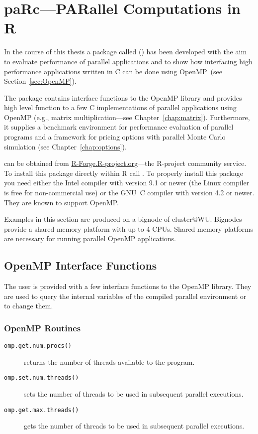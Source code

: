 \section{paRc---PARallel Computations in R}
\label{sec:paRc}

In the course of this thesis a package called 
(\cite{theussl07paRc}) has been developed with the aim
to evaluate performance of parallel applications and to show how
interfacing high performance applications written in C can be done
using OpenMP~(see Section~\ref{sec:OpenMP}).

The package  contains interface functions to the OpenMP library
and provides high level function to a few C implementations of
parallel applications using OpenMP (e.g., matrix multiplication---see
Chapter~\ref{chap:matrix}).
Furthermore, it supplies a benchmark environment for performance
evaluation of parallel programs and a framework for pricing options
with parallel Monte Carlo simulation (see
Chapter~\ref{chap:options}).

 can be obtained from \url{R-Forge.R-project.org}---the
R-project community service. To install this package directly within R
call .
To properly install this package you need either the Intel compiler
with version 9.1 or newer (the Linux compiler is free for
non-commercial use) or the GNU~C compiler with version 4.2 or
newer. They are known to support OpenMP.

Examples in this section are produced on a bignode of
cluster@WU. Bignodes provide a shared memory platform with up to 4
CPUs. Shared memory platforms are necessary for running parallel
OpenMP applications.

\subsection{OpenMP Interface Functions}

The user is provided with a few interface functions to the OpenMP
library. They are used to query the internal variables of the compiled
parallel environment or to change them.

\subsubsection{OpenMP Routines}
\begin{description}
\item[\texttt{omp.get.num.procs()}] returns the number of threads
  available to the program.
\item[\texttt{omp.set.num.threads()}] sets the number of threads to be
  used in subsequent parallel executions.
\item[\texttt{omp.get.max.threads()}] gets the number of threads to be
  used in subsequent parallel executions.
\end{description}


